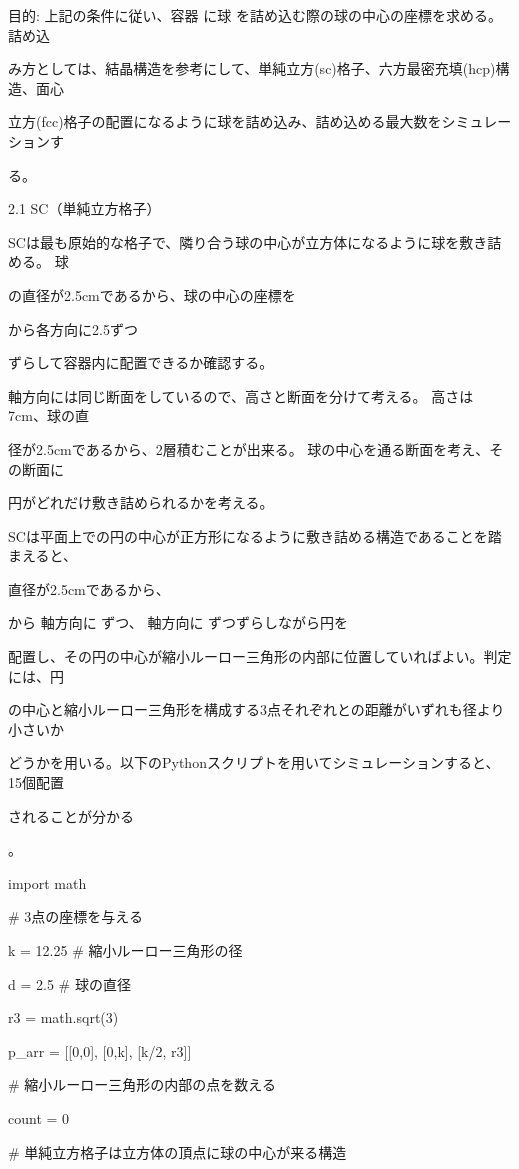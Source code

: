 ⽬的: 上記の条件に従い、容器 に球 を詰め込む際の球の中⼼の座標を求める。詰め込\par
み⽅としては、結晶構造を参考にして、単純⽴⽅(sc)格⼦、六⽅最密充填(hcp)構造、⾯⼼\par
⽴⽅(fcc)格⼦の配置になるように球を詰め込み、詰め込める最⼤数をシミュレーションす\par
る。\par
2.1 SC（単純⽴⽅格⼦）\par
SCは最も原始的な格⼦で、隣り合う球の中⼼が⽴⽅体になるように球を敷き詰める。 球\par
の直径が2.5cmであるから、球の中⼼の座標を\par
から各⽅向に2.5ずつ\par
ずらして容器内に配置できるか確認する。\par
軸⽅向には同じ断⾯をしているので、⾼さと断⾯を分けて考える。 ⾼さは7cm、球の直\par
径が2.5cmであるから、2層積むことが出来る。 球の中⼼を通る断⾯を考え、その断⾯に\par
円がどれだけ敷き詰められるかを考える。\par
SCは平⾯上での円の中⼼が正⽅形になるように敷き詰める構造であることを踏まえると、\par
直径が2.5cmであるから、\par
から 軸⽅向に ずつ、 軸⽅向に ずつずらしながら円を\par
配置し、その円の中⼼が縮⼩ルーロー三⾓形の内部に位置していればよい。判定には、円\par
の中⼼と縮⼩ルーロー三⾓形を構成する3点それぞれとの距離がいずれも径より⼩さいか\par
どうかを⽤いる。以下のPythonスクリプトを⽤いてシミュレーションすると、15個配置\par
されることが分かる\par
。\par
import math\par
\# 3点の座標を与える\par
k = 12.25 \# 縮小ルーロー三角形の径\par
d = 2.5   \# 球の直径\par
r3 = math.sqrt(3)\par
p\_arr = [[0,0], [0,k], [k/2, r3]]\par
\# 縮小ルーロー三角形の内部の点を数える\par
count = 0\par
\# 単純立方格子は立方体の頂点に球の中心が来る構造\par
